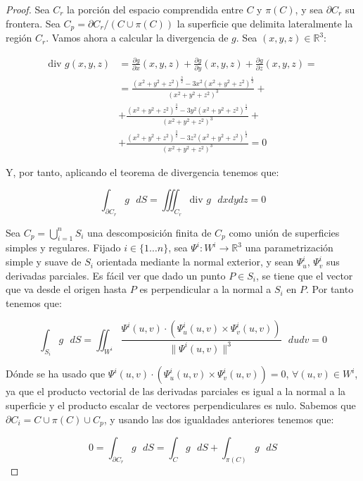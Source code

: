 \begin{proof}

Sea $C_r$ la porción del espacio comprendida entre $C$ y $\pi (C)$, y sea $\partial C_r$ su frontera. Sea $C_p = \partial C_r /(C\cup \pi(C))$ la superficie que delimita lateralmente la región $C_r$. Vamos ahora a calcular la divergencia de $g$. Sea $(x,y,z)\in \mathds{R}^3$:

\begin{align*}
  \textrm{div } g (x,y,z) &= \frac{\partial g}{\partial x}(x,y,z) + \frac{\partial g}{\partial y}(x,y,z) + \frac{\partial g}{\partial z} (x,y,z) =\\
  & = \frac{(x^2+y^2+z^2)^{\frac{3}{2}}-3x^2(x^2+y^2+z^2)^{\frac{1}{2}}}{(x^2+y^2+z^2)^3} +\\
  & + \frac{(x^2+y^2+z^2)^{\frac{3}{2}}-3y^2(x^2+y^2+z^2)^{\frac{1}{2}}}{(x^2+y^2+z^2)^3} +\\
  &+ \frac{(x^2+y^2+z^2)^{\frac{3}{2}}-3z^2(x^2+y^2+z^2)^{\frac{1}{2}}}{(x^2+y^2+z^2)^3} = 0
\end{align*}

Y, por tanto, aplicando el teorema de divergencia tenemos que:

$$\int _{\partial C_r}g\text{ } dS = \iiint _{C_r}\text{div } g \text{ }dx dy dz = 0$$

Sea $C_p = \bigcup _{i=1}^n S_i$ una descomposición finita de $C_p$ como unión de superficies simples y regulares. Fijado $i\in \{1\ldots n\}$, sea $\Psi^i : W^i \rightarrow \mathds{R}^3$ una parametrización simple y suave de $S_i$ orientada mediante la normal exterior, y sean $\Psi^i_u$, $\Psi^i_v$ sus derivadas parciales. Es fácil ver que dado un punto $P\in S_i$, se tiene que el vector que va desde el origen hasta $P$ es perpendicular a la normal a $S_i$ en $P$. Por tanto tenemos que:

$$ \int_{S_i} g\text{ }dS = \iint _{W^i} \frac{\Psi^i(u,v) \cdot (\Psi^i_u(u,v)\times \Psi^i_v (u,v))}{\|\Psi^i(u,v)\|^3}\text{ } du dv = 0$$


Dónde se ha usado que $\Psi^i(u,v) \cdot (\Psi^i_u(u,v)\times \Psi^i_v (u,v)) = 0$, $\forall (u,v)\in W^i$, ya que el producto vectorial de las derivadas parciales es igual a la normal a la superficie y el producto escalar de vectores perpendiculares es nulo. Sabemos que $\partial C_i = C\cup \pi(C) \cup C_p$, y usando las dos igualdades anteriores tenemos que:

$$0 = \int _{\partial C_r}g\text{ } dS = \int _{C}g\text{ } dS + \int _{\pi(C)}g\text{ } dS $$


\end{proof}
